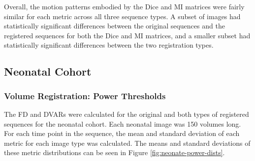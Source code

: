 
Overall, the motion patterns embodied by the Dice and MI matrices were fairly similar for each metric across all three sequence types. A subset of images had statistically significant differences between the original sequences and the registered sequences for both the Dice and MI matrices, and a smaller subset had statistically significant differences between the two registration types. 

\subsection{Neonatal Cohort}

\subsubsection{Volume Registration: Power Thresholds}

The FD and DVARs were calculated for the original and both types of registered sequences for the neonatal cohort. Each neonatal image was 150 volumes long. For each time point in the sequence, the mean and standard deviation of each metric for each image type was calculated. The means and standard deviations of these metric distributions can be seen in Figure \ref{fig:neonate-power-dists}. 

